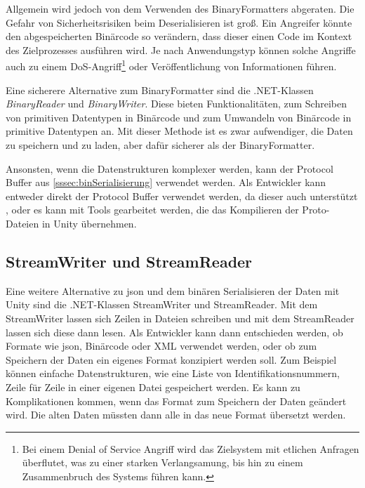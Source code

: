 Allgemein wird jedoch von dem Verwenden des BinaryFormatters abgeraten. Die Gefahr von Sicherheitsrisiken beim Deserialisieren ist groß. Ein Angreifer könnte den abgespeicherten Binärcode so verändern, dass dieser einen Code im Kontext des Zielprozesses ausführen wird. Je nach Anwendungstyp können solche Angriffe auch zu einem DoS-Angriff\footnote{Bei einem Denial of Service Angriff wird das Zielsystem mit etlichen Anfragen überflutet, was zu einer starken Verlangsamung, bis hin zu einem Zusammenbruch des Systems führen kann.\cite{bundDoSDDoSAttacken}} oder Veröffentlichung von Informationen führen.\cite{microsoftDeserializationRisks}

Eine sicherere Alternative zum BinaryFormatter sind die .NET-Klassen \textit{BinaryReader} und \textit{BinaryWriter}. Diese bieten Funktionalitäten, zum Schreiben von primitiven Datentypen in Binärcode und zum Umwandeln von Binärcode in primitive Datentypen an. Mit dieser Methode ist es zwar aufwendiger, die Daten zu speichern und zu laden, aber dafür sicherer als der BinaryFormatter.\cite{microsoftBinaryReaderClass}\cite{microsoftBinaryWriterClass} 

Ansonsten, wenn die Datenstrukturen komplexer werden, kann der Protocol Buffer aus \ref{sssec:binSerialisierung} verwendet werden. Als Entwickler kann entweder direkt der Protocol Buffer verwendet werden, da dieser auch \csharp{} unterstützt \cite{protobufLanguageGuide}, oder es kann mit Tools gearbeitet werden, die das Kompilieren der Proto-Dateien in Unity übernehmen.\cite{githubProtobufUnity}



\subsection{StreamWriter und StreamReader}
Eine weitere Alternative zu \ac{json} und dem binären Serialisieren der Daten mit Unity sind die .NET-Klassen StreamWriter und StreamReader. Mit dem StreamWriter lassen sich Zeilen in Dateien schreiben und mit dem StreamReader lassen sich diese dann lesen.\cite{microsoftStreamWriterKlasse}\cite{microsoftStreamReaderKlasse} Als Entwickler kann dann entschieden werden, ob Formate wie \ac{json}, Binärcode oder XML verwendet werden, oder ob zum Speichern der Daten ein eigenes Format konzipiert werden soll. Zum Beispiel können einfache Datenstrukturen, wie eine Liste von Identifikationsnummern, Zeile für Zeile in einer eigenen Datei gespeichert werden. Es kann zu Komplikationen kommen, wenn das Format zum Speichern der Daten geändert wird. Die alten Daten müssten dann alle in das neue Format übersetzt werden.



